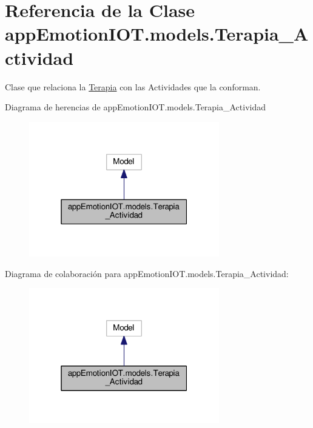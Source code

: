 \hypertarget{classappEmotionIOT_1_1models_1_1Terapia__Actividad}{}\section{Referencia de la Clase app\+Emotion\+I\+O\+T.\+models.\+Terapia\+\_\+\+Actividad}
\label{classappEmotionIOT_1_1models_1_1Terapia__Actividad}


Clase que relaciona la \hyperlink{classappEmotionIOT_1_1models_1_1Terapia}{Terapia} con las Actividades que la conforman.  




Diagrama de herencias de app\+Emotion\+I\+O\+T.\+models.\+Terapia\+\_\+\+Actividad
\nopagebreak
\begin{figure}[H]
\begin{center}
\leavevmode
\includegraphics[width=235pt]{classappEmotionIOT_1_1models_1_1Terapia__Actividad__inherit__graph}
\end{center}
\end{figure}


Diagrama de colaboración para app\+Emotion\+I\+O\+T.\+models.\+Terapia\+\_\+\+Actividad\+:
\nopagebreak
\begin{figure}[H]
\begin{center}
\leavevmode
\includegraphics[width=235pt]{classappEmotionIOT_1_1models_1_1Terapia__Actividad__coll__graph}
\end{center}
\end{figure}
